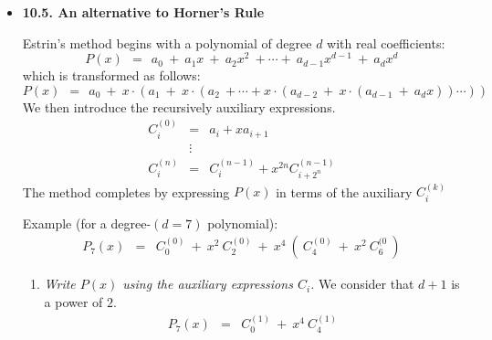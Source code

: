 \begin{itemize}
\item {\bf 10.5. An alternative to Horner's Rule}

\smallskip


Estrin's method begins with a polynomial of degree $d$ with real coefficients:
\[
P(x) \ \ = \ \ a_0 \ + \ a_1 x \ + \ a_2 x^2 \ + \cdots + \ a_{d-1} x^{d-1} \ + \ a_d x^d
\]
which is transformed as follows:
\[
P(x) \ \ = \ \ a_0 \ + \ x \cdot (a_1 \ + \ x \cdot (a_2  \ +  \cdots                                          
+ x \cdot (a_{d-2} \ + \ x \cdot (a_{d-1} \ + \ a_d x)) \cdots ))
\]
We then introduce the recursively auxiliary expressions.  
\begin{eqnarray*}
C_i^{(0)} & = & a_i + x a_{i+1} \\
                &\vdots &  \\
C_i^{(n)}  & = & C_i^{(n-1)} + x^{2n} C_{i+2^n}^{(n-1)}
\end{eqnarray*}
The method completes by expressing $P(x)$ in terms of the auxiliary $C_i^{(k)}$
\smallskip

Example (for a degree-$(d=7)$ polynomial):
\begin{eqnarray*}
P_7(x) & = & C_{0}^{(0)} \ + \ x^2 \ C_2^{(0)} \ + \ x^4 \ ( \ C_4^{(0)} \ + \ x^2 \ C_6^{(0} \ )
\end{eqnarray*}

\begin{enumerate}
\item
{\em Write $P(x)$ using the auxiliary expressions $C_i$.}  
We consider that $d+1$ is a power of $2$.
\begin{eqnarray*}
P_7(x)            & = & C_0^{(1)} \ + \ x^4 \ C_4^{(1)}
\end{eqnarray*}


\end{enumerate}
\end{itemize}
